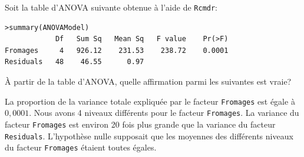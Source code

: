 \begin{questions}

\vspace{1cm}

\question[3] Soit la table d'ANOVA suivante obtenue à l'aide de \texttt{Rcmdr}:
\begin{verbatim}
>summary(ANOVAModel)
            Df   Sum Sq   Mean Sq   F value    Pr(>F)    
Fromages     4   926.12    231.53    238.72    0.0001 
Residuals   48    46.55      0.97                      
\end{verbatim}

À partir de la table d'ANOVA, quelle affirmation parmi les suivantes est vraie?



\begin{checkboxes}
\choice La proportion de la variance totale expliquée par le facteur \texttt{Fromages} est égale à $0,0001$. 
\choice Nous avons 4 niveaux différents pour le facteur \texttt{Fromages}.
\choice La variance du facteur \texttt{Fromages} est environ 20 fois plus grande que la variance du facteur \texttt{Residuals}.
\correctchoice L'hypothèse nulle supposait que les moyennes des différents niveaux du facteur \texttt{Fromages} étaient toutes égales.
\end{checkboxes}


\end{questions}
